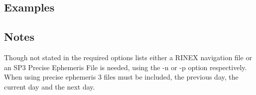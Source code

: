 \subsection{Examples}


\subsection{Notes}
Though not stated in the required options lists either a RINEX navigation file or an SP3 Precise Ephemeris File is needed, using the -n or -p option respectively. When using precise ephemeris 3 files must be included, the previous day, the current day and the next day. 

%

